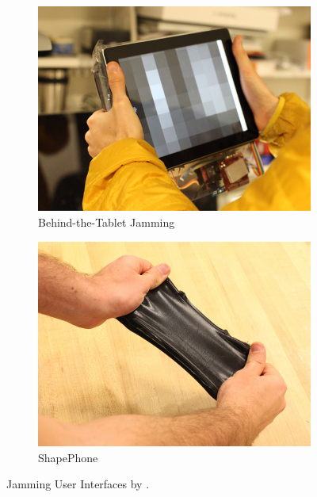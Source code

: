 \begin{figure}
        \begin{subfigure}[b]{0.44\textwidth}
                \centering
                \includegraphics[width=\textwidth]{figures/jamming/jui_behind-the-tablet}
                \caption{Behind-the-Tablet Jamming}
                \label{fig:ch:jamming:jui-tablet}
        \end{subfigure}
        \hspace{0.02\textwidth}
        \begin{subfigure}[b]{0.44\textwidth}
                \centering
                \includegraphics[width=\textwidth]{figures/jamming/jui_shapephone}
                \caption{ShapePhone}
                \label{fig:ch:jamming:jui-phone}
        \end{subfigure}
        \caption{Jamming User Interfaces by \citet{follmer2012jamming}.}
        \label{fig:ch:jamming:jui-collection}
\end{figure}

